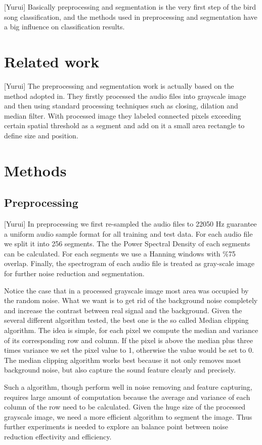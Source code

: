 \documentclass{article} %
\begin{document}
[Yurui] Basically preprocessing and segmentation is the very first step of the bird song classification, and the methods used in preprocessing and segmentation have a big influence on classification results.


\section{Related work}
[Yurui] The preprocessing and segmentation work is actually based on the method adopted in\cite{Lasseck13}. They firstly processed the audio files into grayscale image and then using standard processing techniques such as closing, dilation and median filter. With processed image they labeled connected pixels exceeding certain spatial threshold as a segment and add on it a small area rectangle to define size and position.

\section{Methods}

\subsection{Preprocessing}
[Yurui] In preprocessing we first re-sampled the audio files to 22050 Hz guarantee a uniform audio sample format for all training and test data. For each audio file we split it into 256 segments. The the Power Spectral Density of each segments can be calculated. For each segments we use a Hanning windows with \%75 overlap. Finally, the spectrogram of each audio file is treated as gray-scale image for further noise reduction and segmentation.

Notice the case that in a processed grayscale image most area was occupied by the random noise. What we want is to get rid of the background noise completely and increase the contrast between real signal and the background. Given the several different algorithm tested, the best one is the so called Median clipping algorithm. The idea is simple, for each pixel we compute the median and variance of its corresponding row and column. If the pixel is above the median plus three times variance we set the pixel value to 1, otherwise the value would be set to 0. The median clipping algorithm works best because it not only removes most background noise, but also capture the sound feature clearly and precisely.

Such a algorithm, though perform well in noise removing and feature capturing, requires large amount of computation because the average and variance of each column of the row need to be calculated. Given the huge size of the processed grayscale image, we need a more efficient algorithm to segment the image. Thus further experiments is needed to explore an balance point between noise reduction effectivity and efficiency.
\end{document}
